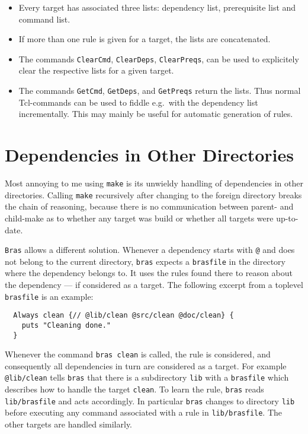 \documentclass[12pt]{article}
\newcommand{\bras}{\texttt{bras}}
\newcommand{\Bras}{\texttt{Bras}}
\newcommand{\make}{\texttt{make}}
\begin{document}
\begin{itemize}
\item
Every target has associated three lists: dependency list, prerequisite
list and command list.
\item
If more than one rule is given for a target, the lists are
concatenated. 
\item
The commands \texttt{ClearCmd}, \texttt{ClearDeps},
\texttt{ClearPreqs}, can be used to explicitely clear the respective
lists for a given target.
\item
The commands \texttt{GetCmd}, \texttt{GetDeps}, and
\texttt{GetPreqs} return the lists. Thus normal Tcl-commands can be
used to fiddle e.g.\ with the dependency list incrementally. This may
mainly be useful for automatic generation of rules.
\end{itemize}


\section{Dependencies in Other Directories}

Most annoying to me using \make{} is its unwieldy handling of
dependencies in other directories. Calling \make{}
recursively after changing to the foreign directory
breaks the chain of reasoning, because there is no communication
between parent- and child-make as to whether any target was build or
whether all targets were up-to-date.

\Bras{} allows a different solution. Whenever a dependency starts with
\texttt{@} and does not belong to the current directory, \bras{} expects
a \texttt{brasfile} in the directory where the dependency belongs
to. It uses the rules found there to reason about the dependency ---
if considered as a target.  The following excerpt from a
toplevel \texttt{brasfile} is an example:

\begin{verbatim}
  Always clean {// @lib/clean @src/clean @doc/clean} {
    puts "Cleaning done."
  }
\end{verbatim}

Whenever the command \texttt{bras clean}
is called, the rule is considered, and consequently all
dependencies in turn are considered as a target. For example
\texttt{@lib/clean} tells \bras{} that there is a subdirectory
\texttt{lib} with a \texttt{brasfile} which
describes how to handle the target \texttt{clean}. To learn
the rule, \bras{} reads \texttt{lib/bras\-file} and acts accordingly.
In particular \bras{} changes to directory \texttt{lib}
before executing any command associated with a rule in
\texttt{lib/brasfile}. The other targets are handled similarly.
\end{document}
